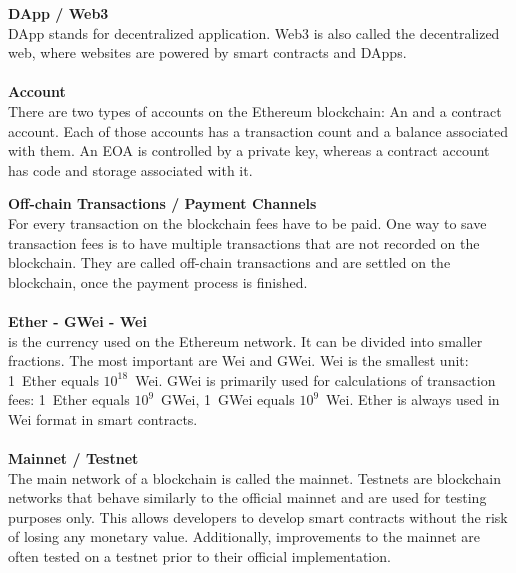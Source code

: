 \textbf{DApp / Web3}\\
DApp stands for decentralized application.
Web3 is also called the decentralized web, where websites are powered by smart contracts and DApps.
\\\\

\textbf{Account}\\
There are two types of accounts on the Ethereum blockchain: An  and a contract account.
Each of those accounts has a transaction count and a balance\cite{ethereum-yellow-paper} associated with them.
An EOA is controlled by a private key, whereas a contract account has code and storage associated with it.
\newpage

\textbf{Off-chain Transactions / Payment Channels}\\
For every transaction on the blockchain fees have to be paid.
One way to save transaction fees is to have multiple transactions that are not recorded on the blockchain.
They are called off-chain transactions and are settled on the blockchain, once the payment process is finished.
\\\\

\textbf{Ether - GWei - Wei}\\
 is the currency used on the Ethereum network.
It can be divided into smaller fractions.
The most important are Wei and GWei.
Wei is the smallest unit: 1~Ether equals \(10^{18}\)~Wei\cite{ethereum-yellow-paper}.
GWei is primarily used for calculations of transaction fees: 1~Ether equals \(10^{9}\)~GWei, 1~GWei equals \(10^{9}\)~Wei.
Ether is always used in Wei format in smart contracts.
\\\\

\textbf{Mainnet / Testnet}\\
The main network of a blockchain is called the mainnet.
Testnets are blockchain networks that behave similarly to the official mainnet and are used for testing purposes only.
This allows developers to develop smart contracts without the risk of losing any monetary value.
Additionally, improvements to the mainnet are often tested on a testnet prior to their official implementation.
